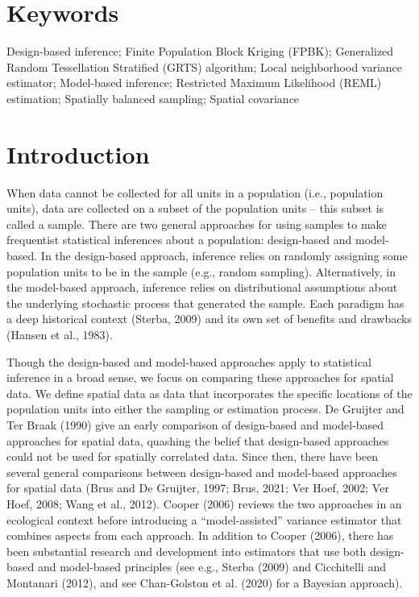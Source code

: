 \documentclass[]{elsarticle} %
\begin{document}
\hypertarget{keywords}{%
\section*{Keywords}\label{keywords}}

Design-based inference; Finite Population Block Kriging (FPBK);
Generalized Random Tessellation Stratified (GRTS) algorithm; Local
neighborhood variance estimator; Model-based inference; Restricted
Maximum Likelihood (REML) estimation; Spatially balanced sampling;
Spatial covariance

\hypertarget{sec:introduction}{%
\section{Introduction}\label{sec:introduction}}

When data cannot be collected for all units in a population (i.e.,
population units), data are collected on a subset of the population
units -- this subset is called a sample. There are two general
approaches for using samples to make frequentist statistical inferences
about a population: design-based and model-based. In the design-based
approach, inference relies on randomly assigning some population units
to be in the sample (e.g., random sampling). Alternatively, in the
model-based approach, inference relies on distributional assumptions
about the underlying stochastic process that generated the sample. Each
paradigm has a deep historical context (Sterba, 2009) and its own set of
benefits and drawbacks (Hansen et al., 1983).

Though the design-based and model-based approaches apply to statistical
inference in a broad sense, we focus on comparing these approaches for
spatial data. We define spatial data as data that incorporates the
specific locations of the population units into either the sampling or
estimation process. De Gruijter and Ter Braak (1990) give an early
comparison of design-based and model-based approaches for spatial data,
quashing the belief that design-based approaches could not be used for
spatially correlated data. Since then, there have been several general
comparisons between design-based and model-based approaches for spatial
data (Brus and De Gruijter, 1997; Brus, 2021; Ver Hoef, 2002; Ver Hoef,
2008; Wang et al., 2012). Cooper (2006) reviews the two approaches in an
ecological context before introducing a ``model-assisted'' variance
estimator that combines aspects from each approach. In addition to
Cooper (2006), there has been substantial research and development into
estimators that use both design-based and model-based principles (see
e.g., Sterba (2009) and Cicchitelli and Montanari (2012), and see
Chan-Golston et al. (2020) for a Bayesian approach).
\end{document}
